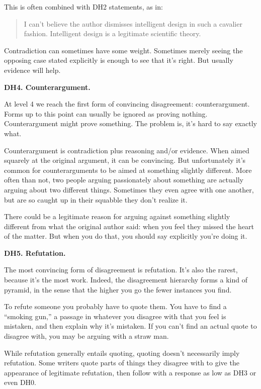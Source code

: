 This is often combined with DH2 statements, as in:

\begin{quote}
I can't believe the author dismisses intelligent design in such a
cavalier fashion. Intelligent design is a legitimate scientific theory.
\end{quote}

Contradiction can sometimes have some weight. Sometimes merely seeing
the opposing case stated explicitly is enough to see that it's right.
But usually evidence will help.

\textbf{DH4. Counterargument.}

At level 4 we reach the first form of convincing disagreement:
counterargument. Forms up to this point can usually be ignored as
proving nothing. Counterargument might prove something. The problem is,
it's hard to say exactly what.

Counterargument is contradiction plus reasoning and/or evidence. When
aimed squarely at the original argument, it can be convincing. But
unfortunately it's common for counterarguments to be aimed at something
slightly different. More often than not, two people arguing passionately
about something are actually arguing about two different things.
Sometimes they even agree with one another, but are so caught up in
their squabble they don't realize it.

There could be a legitimate reason for arguing against something
slightly different from what the original author said: when you feel
they missed the heart of the matter. But when you do that, you should
say explicitly you're doing it.

\textbf{DH5. Refutation.}

The most convincing form of disagreement is refutation. It's also the
rarest, because it's the most work. Indeed, the disagreement hierarchy
forms a kind of pyramid, in the sense that the higher you go the fewer
instances you find.

To refute someone you probably have to quote them. You have to find a
``smoking gun,'' a passage in whatever you disagree with that you feel
is mistaken, and then explain why it's mistaken. If you can't find an
actual quote to disagree with, you may be arguing with a straw man.

While refutation generally entails quoting, quoting doesn't necessarily
imply refutation. Some writers quote parts of things they disagree with
to give the appearance of legitimate refutation, then follow with a
response as low as DH3 or even DH0.

